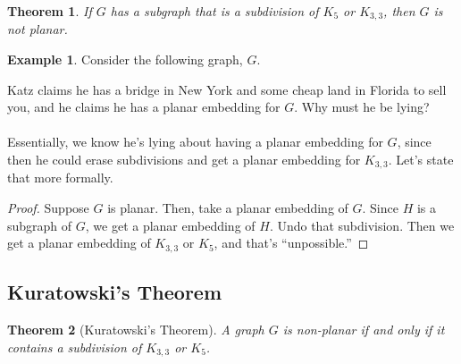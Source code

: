 \documentclass[]{article}
\newtheorem*{theorem}{Theorem}
\theoremstyle{definition}
\newtheorem{ex}{Example}[section]
\begin{document}
			\begin{theorem}
				If $G$ has a subgraph that is a subdivision of $K_5$ or $K_{3,3}$, then $G$ is not planar.
			\end{theorem}

			\begin{ex}
				Consider the following graph, $G$.
				\begin{center}
				\end{center}
				Katz claims he has a bridge in New York and some cheap land in Florida to sell you, and he claims he has a planar embedding for $G$. Why must he be lying?
				\\ \\
				Essentially, we know he's lying about having a planar embedding for $G$, since then he could erase subdivisions and get a planar embedding for $K_{3, 3}$. Let's state that more formally.

				\begin{proof}
					Suppose $G$ is planar. Then, take a planar embedding of $G$. Since $H$ is a subgraph of $G$, we get a planar embedding of $H$. Undo that subdivision. Then we get a planar embedding of $K_{3, 3}$ or $K_5$, and that's ``unpossible.''
				\end{proof}
			\end{ex}

		\subsection{Kuratowski's Theorem}
			\begin{theorem}[Kuratowski's Theorem]
				A graph $G$ is non-planar if and only if it contains a subdivision of $K_{3,3}$ or $K_5$.
			\end{theorem}
\end{document}
